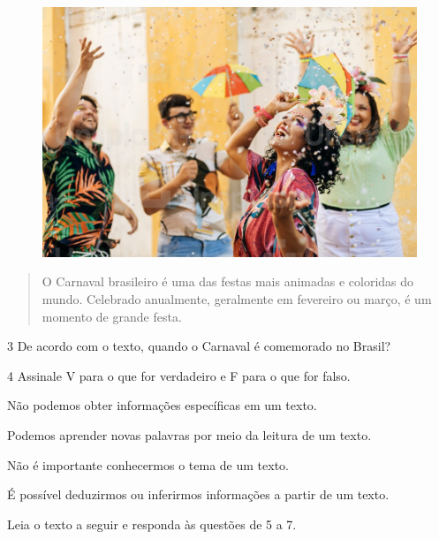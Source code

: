 \begin{figure}[htpb!]
\includegraphics[width=\textwidth]{./imgs/img2.jpg}
\end{figure}

\begin{quote}
O Carnaval brasileiro é uma das festas mais animadas e coloridas do
mundo. Celebrado anualmente, geralmente em fevereiro ou março, é um
momento de grande festa.

\end{quote}



\num{3} De acordo com o texto, quando o Carnaval é comemorado no Brasil?


\num{4} Assinale V para o que for verdadeiro e F para o que for falso.

\begin{boxlist}
 Não podemos obter informações específicas em um texto.

 Podemos aprender novas palavras por meio da leitura de um texto.

 Não é importante conhecermos o tema de um texto.

 É possível deduzirmos ou inferirmos informações a partir de um texto.
\end{boxlist}

Leia o texto a seguir e responda às questões de 5 a 7.


